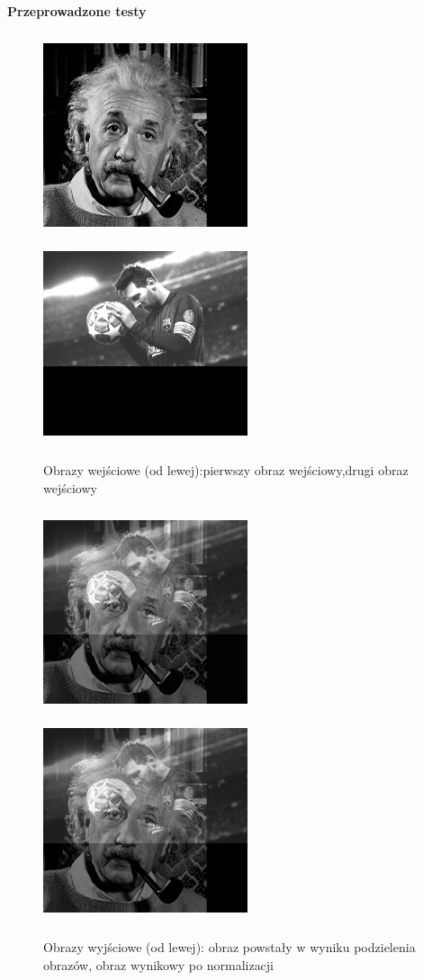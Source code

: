 \documentclass[magisterska,openany]{pracadypl}
\begin{document}
\newpage
\vspace{0.25cm}\textbf{\Large Przeprowadzone testy}
\vspace{0.5cm}
\begin{figure}[h]
\centering
\includegraphics[width=6cm, height=6cm]{2_2/ResolG1.jpg}
\includegraphics[width=6cm, height=6cm]{2_2/ResolG2.jpg}
\caption{Obrazy wejściowe (od lewej):pierwszy obraz wejściowy,drugi obraz wejściowy}
\end{figure}
\begin{figure}[h]
\centering
\includegraphics[width=6cm, height=6cm]{3_8/div_twoG1.jpg}
\includegraphics[width=6cm, height=6cm]{3_8/ndiv_twoG1.jpg}
\caption{Obrazy wyjściowe (od lewej): obraz powstały w wyniku
podzielenia obrazów, obraz wynikowy po normalizacji}
\end{figure}
\end{document}
